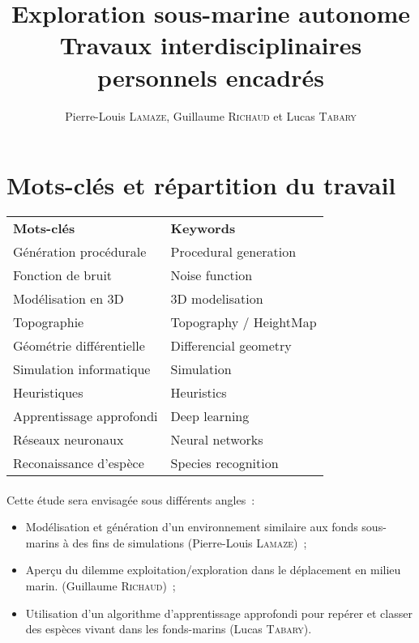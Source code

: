 \documentclass{article}
\title{Exploration sous-marine autonome \\ \normalsize Travaux interdisciplinaires personnels encadrés}
\author{Pierre-Louis \textsc{Lamaze}, Guillaume \textsc{Richaud} et Lucas \textsc{Tabary}}
\date{}
\begin{document}
\maketitle
\thispagestyle{fancy}
\cfoot{}

\section*{Mots-clés et répartition du travail}

\begin{center}
  \begin{tabular}{ll}
    \rowcolor{gray!50}
    \bf Mots-clés & \bf Keywords\\
    Génération procédurale & Procedural generation \\
    Fonction de bruit & Noise function \\
    Modélisation en 3D & 3D modelisation \\
    Topographie & Topography / HeightMap \\
    Géométrie différentielle & Differencial geometry \\
    Simulation informatique & Simulation \\
    Heuristiques & Heuristics \\
    Apprentissage approfondi & Deep learning \\
    Réseaux neuronaux & Neural networks \\
    Reconaissance d'espèce & Species recognition \\
  \end{tabular}
\end{center}

\paragraph{} Cette étude sera envisagée sous différents angles~:
\begin{itemize}
  \item Modélisation et génération d'un environnement similaire aux fonds sous-marins à des fins de simulations \cite{genevaux:tel-01196438, guerin:tel-01635126, McHugh:2016, gustavson:2005} (Pierre-Louis \textsc{Lamaze})~;
  \item Aperçu du dilemme exploitation/exploration dans le déplacement en milieu marin. \cite{sigaud:inria-00326864, benzaki:2017, manhaes:2017} (Guillaume \textsc{Richaud})~;
  \item Utilisation d'un algorithme d'apprentissage approfondi pour repérer et classer des espèces vivant dans les fonds-marins \cite{3B1B:2018, Branson:2014, Rathi:2018} (Lucas \textsc{Tabary}).
\end{itemize}



\end{document}
